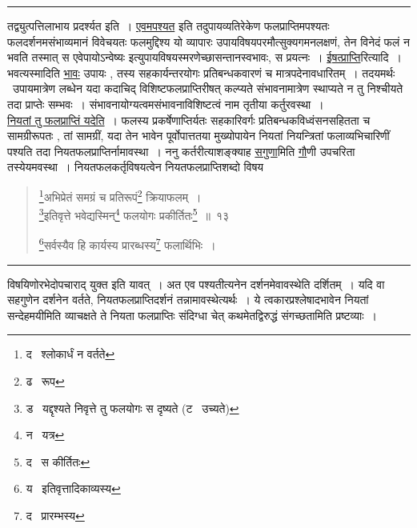 \documentclass[11pt, openany]{book}
\begin{document}
\hrule

\vspace{2mm}
\noindent
तद्व्युत्पत्तिलाभाय प्रदर्श्यत इति~। \underline{एवमपश्यत} इति तदुपायव्यतिरेकेण फलप्राप्तिमपश्यतः फलदर्शनमसंभाव्यमानं विवेचयतः फलमुद्दिश्य यो व्यापारः उपायविषयपरमौत्सुक्यगमनलक्षणं, तेन विनेदं फलं न भवति तस्मात् स एवेपायोऽन्वेष्यः इत्युपायविषयस्मरणेच्छासन्तानस्वभावः, स प्रयत्नः~। \underline{ईषत्प्राप्ति}रित्यादि~। भवत्यस्मादिति \underline{भावः} उपायः , तस्य सहकार्यन्तरयोगः प्रतिबन्धकवारणं च मात्रपदेनावधारितम्~। तदयमर्थः \textendash\ उपायमात्रेण लब्धेन यदा कदाचिद् विशिष्टफलप्राप्तिरीषत् कल्प्यते संभावनामात्रेण स्थाप्यते न तु निश्चीयते तदा प्राप्तेः सम्भवः~। संभावनायोग्यत्वमसंभावनाविशिष्टत्वं नाम तृतीया कर्तुरवस्था~।\\

\underline{नियतां तु फलप्राप्तिं यदेति}~। फलस्य प्रकर्षेणाप्तिर्यतः सहकारिवर्गः प्रतिबन्धकविध्वंसनसहितता च सामग्रीरूपतः , तां सामग्रीं, यदा तेन भावेन पूर्वोपात्ततया मुख्योपायेन नियतां नियन्त्रितां फलाव्यभिचारिणीं पश्यति तदा नियतफलप्राप्तिर्नामावस्था~। ननु कर्तरीत्याशङ्क्याह \underline{सगुणा}मिति \underline{गौ}णी उपचरिता तस्येयमवस्था~। नियतफलकर्तृविषयत्वेन नियतफलप्राप्तिशब्दो विषय \textendash

\newpage

\begin{quote}
{\na \renewcommand{\thefootnote}{1}\footnote{द \textendash\ श्लोकार्धं न वर्तते}अभिप्रेतं समग्रं च प्रतिरूपं\renewcommand{\thefootnote}{2}\footnote{ढ \textendash\ रूप} क्रियाफलम्~।\\
\renewcommand{\thefootnote}{3}\footnote{ड \textendash\ यद्दृश्यते निवृत्ते तु फलयोगः स दृष्यते (ट \textendash\ उच्यते)}इतिवृत्ते भवेद्यस्मिन्\renewcommand{\thefootnote}{4}\footnote{न \textendash\ यत्र} फलयोगः प्रकीर्तितः\renewcommand{\thefootnote}{5}\footnote{द \textendash\ स कीर्तितः}~॥~१३

\renewcommand{\thefootnote}{6}\footnote{य \textendash\ इतिवृत्तादिकाव्यस्य}सर्वस्यैव हि कार्यस्य प्रारब्धस्य\renewcommand{\thefootnote}{7}\footnote{द \textendash\ प्रारम्भस्य} फलार्थिभिः~।}
\end{quote}

\hrule

\vspace{2mm}
\noindent
विषयिणोरभेदोपचाराद् युक्त इति यावत्~। अत एव पश्यतीत्यनेन दर्शनमेवावस्थेति दर्शितम्~। यदि वा सहगुणेन दर्शनेन वर्तते, नियतफलप्राप्तिदर्शनं तन्नामावस्थेत्यर्थः~। ये त्वकारप्रश्लेषादभावेन नियतां सन्देहमयीमिति व्याचक्षते ते नियता फलप्राप्तिः संदिग्धा चेत् कथमेतद्विरुद्धं संगच्छतामिति प्रष्टव्याः~।\\
\end{document}
